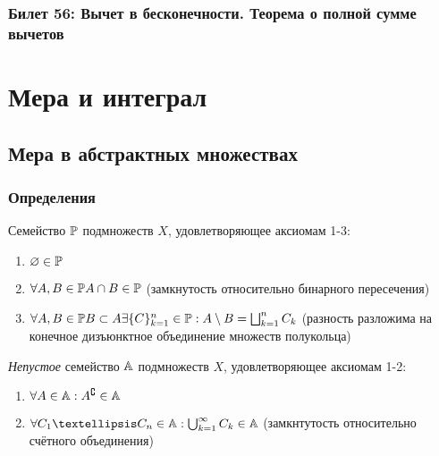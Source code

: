\documentclass[12pt, a4paper, oneside]{memoir}
\begin{document}
\subsection{Билет 56: Вычет в бесконечности. Теорема о полной сумме вычетов}






\chapter{Мера и интеграл}


\section{Мера в абстрактных множествах}

\subsection{Определения}

\begin{definition}

    Семейство ${\mathbb{P}}$ подмножеств $X$, удовлетворяющее аксиомам 1-3:

    \begin{enumerate}
        \item $\varnothing \in {\mathbb{P}}$
        \item $\forall A, B \in {\mathbb{P}} A \cap B \in {\mathbb{P}}$ (замкнутость относительно бинарного пересечения)
        \item $\forall A, B \in {\mathbb{P}} B \subset A \exists \{ C \}_{k = 1}^n \in {\mathbb{P}}: A \setminus B = \bigsqcup_{k = 1}^n C_k$
        (разность разложима на конечное дизъюнктное объединение множеств полукольца)
    \end{enumerate}
\end{definition}

\begin{definition}

    \textit{Непустое} семейство ${\mathbb{A}}$ подмножеств $X$, удовлетворяющее аксиомам 1-2:

    \begin{enumerate}
        \item $\forall A \in {\mathbb{A}}: A^{\complement} \in {\mathbb{A}}$
        \item $\forall C_1 … C_n \in \sA: \bigcup_{k = 1}^\infty C_k \in \sA$ (замкнтутость относительно счётного объединения)
    \end{enumerate}
\end{definition}
\end{document}
